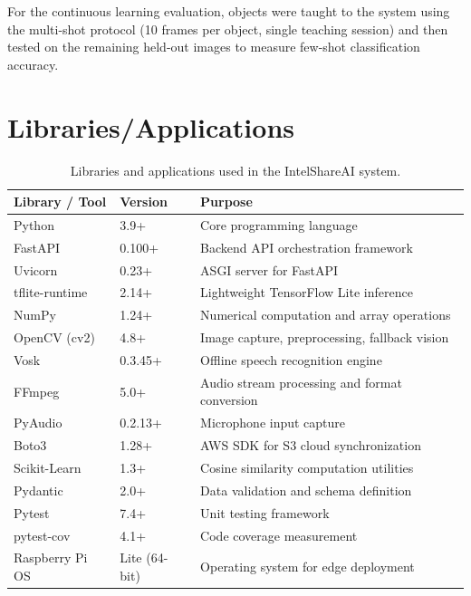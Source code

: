 \documentclass[12pt,a4paper]{report}
\begin{document}
For the continuous learning evaluation, objects were taught to the system using the multi-shot protocol (10 frames per object, single teaching session) and then tested on the remaining held-out images to measure few-shot classification accuracy.

\section{Libraries/Applications}
\begin{table}[H]
    \caption{Libraries and applications used in the IntelShareAI system.}
    \vspace{0.5em}
    \centering
    \renewcommand{\arraystretch}{1.2}
    \small
    \begin{tabular}{|p{3.5cm}|p{3cm}|p{6cm}|}
        \hline
        \textbf{Library / Tool} & \textbf{Version} & \textbf{Purpose} \\
        \hline
        Python & 3.9+ & Core programming language \\
        \hline
        FastAPI & 0.100+ & Backend API orchestration framework \\
        \hline
        Uvicorn & 0.23+ & ASGI server for FastAPI \\
        \hline
        tflite-runtime & 2.14+ & Lightweight TensorFlow Lite inference \\
        \hline
        NumPy & 1.24+ & Numerical computation and array operations \\
        \hline
        OpenCV (cv2) & 4.8+ & Image capture, preprocessing, fallback vision \\
        \hline
        Vosk & 0.3.45+ & Offline speech recognition engine \\
        \hline
        FFmpeg & 5.0+ & Audio stream processing and format conversion \\
        \hline
        PyAudio & 0.2.13+ & Microphone input capture \\
        \hline
        Boto3 & 1.28+ & AWS SDK for S3 cloud synchronization \\
        \hline
        Scikit-Learn & 1.3+ & Cosine similarity computation utilities \\
        \hline
        Pydantic & 2.0+ & Data validation and schema definition \\
        \hline
        Pytest & 7.4+ & Unit testing framework \\
        \hline
        pytest-cov & 4.1+ & Code coverage measurement \\
        \hline
        Raspberry Pi OS & Lite (64-bit) & Operating system for edge deployment \\
        \hline
    \end{tabular}
\end{table}
\end{document}
